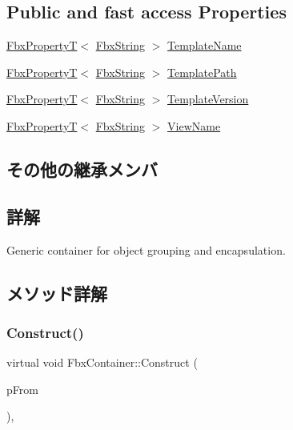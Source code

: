 \subsection*{Public and fast access Properties}
\begin{DoxyCompactItemize}
\item 
\hyperlink{class_fbx_property_t}{Fbx\+PropertyT}$<$ \hyperlink{class_fbx_string}{Fbx\+String} $>$ \hyperlink{class_fbx_container_a44b1cee6dbe9941f8fdfa25937d85ce2}{Template\+Name}
\item 
\hyperlink{class_fbx_property_t}{Fbx\+PropertyT}$<$ \hyperlink{class_fbx_string}{Fbx\+String} $>$ \hyperlink{class_fbx_container_a8d66563e359fda83e5b67017140e97d1}{Template\+Path}
\item 
\hyperlink{class_fbx_property_t}{Fbx\+PropertyT}$<$ \hyperlink{class_fbx_string}{Fbx\+String} $>$ \hyperlink{class_fbx_container_a0fcd3f02b0b9df51cfd82902c794e709}{Template\+Version}
\item 
\hyperlink{class_fbx_property_t}{Fbx\+PropertyT}$<$ \hyperlink{class_fbx_string}{Fbx\+String} $>$ \hyperlink{class_fbx_container_afdbbb7add5452cf3ee2fcf13c47a00cf}{View\+Name}
\end{DoxyCompactItemize}
\subsection*{その他の継承メンバ}


\subsection{詳解}
Generic container for object grouping and encapsulation. 

\subsection{メソッド詳解}
\mbox{\label{class_fbx_container_a65204439a64fd2184467e41d994bec0a}} 
\subsubsection{\texorpdfstring{Construct()}{Construct()}}
{\footnotesize\ttfamily virtual void Fbx\+Container\+::\+Construct (\begin{DoxyParamCaption}\item[{const \hyperlink{class_fbx_object}{Fbx\+Object} $\ast$}]{p\+From }\end{DoxyParamCaption})\hspace{0.3cm}{\ttfamily [protected]}, {\ttfamily [virtual]}}

